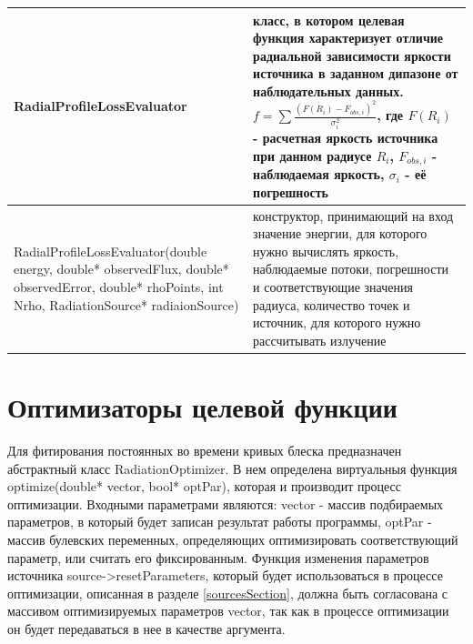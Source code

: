 \begin{small}
\begin{xtabular}{|p{0.5\textwidth}|p{0.5\textwidth}|}
		\hline
		\textbf{RadialProfileLossEvaluator} & класс, в котором целевая функция характеризует отличие радиальной зависимости яркости источника в заданном дипазоне от наблюдательных данных. $f = \sum \frac{(F(R_i) - F_{obs,i})^2}{\sigma_i^2}$, где $F(R_i)$ - расчетная яркость источника при данном радиусе $R_i$, $F_{obs,i}$ - наблюдаемая яркость, $\sigma_i$ - её погрешность\\
		\hline
		RadialProfileLossEvaluator(double energy, double* observedFlux, double* observedError, double* rhoPoints, int Nrho, RadiationSource* radiaionSource) & конструктор, принимающий на вход значение энергии, для которого нужно вычислять яркость, наблюдаемые потоки, погрешности и соответствующие значения радиуса, количество точек и источник, для которого нужно рассчитывать излучение\\
		\hline
	\end{xtabular}
\end{small}

\section{Оптимизаторы целевой функции}
Для фитирования постоянных во времени кривых блеска предназначен абстрактный класс RadiationOptimizer. В нем определена виртуальныя функция optimize(double* vector, bool* optPar), которая и производит процесс оптимизации. Входными параметрами являются: vector - массив подбираемых параметров, в который будет записан результат работы программы, optPar - массив булевских переменных, определяющих оптимизировать соответствующий параметр, или считать его фиксированным. Функция изменения параметров источника source->resetParameters, который будет использоваться в процессе оптимизации, описанная в разделе \ref{sourcesSection}, должна быть согласована с массивом оптимизируемых параметров vector, так как в процессе оптимизации он будет передаваться в нее в качестве аргумента.

